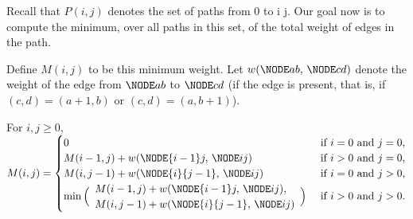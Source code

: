 Recall that $P(i, j)$ denotes the set of paths from  0 to \NODE i  j.
Our goal now is to compute the minimum, over all paths in this set, of the total weight of edges in the path.

\smallskip

Define $M(i, j)$ to be this minimum weight.
Let $w(\NODE a b,\, \NODE c d)$
denote the weight of the edge from $\NODE a b$ to $\NODE c d$
(if the edge is present, that is, if $(c,d) = (a+1, b)$ or $(c,d) = (a, b+1)$).

\begin{lemma}\label{dp: lemma weight} For $i, j \ge 0$,
  \(
  M(i,j) = \begin{cases}
    0 & \text{ if } i=0 \text{ and } j=0,\\
    M(i-1, j)+ w(\NODE {i-1} j,\, \NODE i j) & \text{ if }i > 0 \text{ and } j=0, \\
    M(i, j-1)+ w(\NODE {i} {j-1},\, \NODE i j) & \text{ if } i=0  \text{ and } j > 0,\\
    \min\Big(\begin{array}{l}
      M(i-1, j)+ w(\NODE {i-1} j,\, \NODE i j), \\
      M(i, j-1)+ w(\NODE {i} {j-1},\, \NODE i j)
    \end{array}\Big)
    & \text{ if } i>0 \text{ and } j> 0.
  \end{cases}
  \)
\end{lemma}

